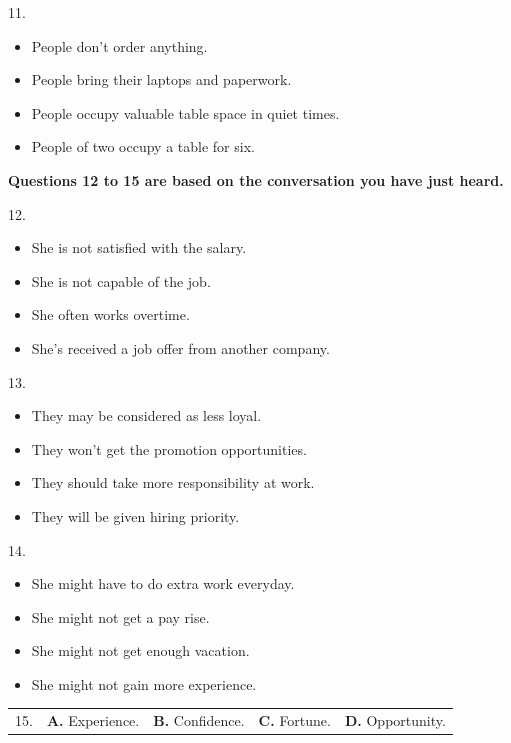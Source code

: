 \documentclass[UTF8,11pt]{ctexart}
\begin{document}
11.


\begin{itemize}[leftmargin=2em,itemsep=.2em,topsep=.4em]\item[A.] People don't order anything.
\item[B.] People bring their laptops and paperwork.
\item[C.] People occupy valuable table space in quiet times.
\item[D.] People of two occupy a table for six.
\end{itemize}

\textbf{Questions 12 to 15 are based on the conversation you have just heard.}


12.


\begin{itemize}[leftmargin=2em,itemsep=.2em,topsep=.4em]\item[A.] She is not satisfied with the salary.
\item[B.] She is not capable of the job.
\item[C.] She often works overtime.
\item[D.] She's received a job offer from another company.
\end{itemize}

13.


\begin{itemize}[leftmargin=2em,itemsep=.2em,topsep=.4em]\item[A.] They may be considered as less loyal.
\item[B.] They won't get the promotion opportunities.
\item[C.] They should take more responsibility at work.
\item[D.] They will be given hiring priority.
\end{itemize}

14.


\begin{itemize}[leftmargin=2em,itemsep=.2em,topsep=.4em]\item[A.] She might have to do extra work everyday.
\item[B.] She might not get a pay rise.
\item[C.] She might not get enough vacation.
\item[D.] She might not gain more experience.
\end{itemize}

\noindent\begin{tabularx}{\linewidth}{@{}lXXXX@{}}15. & \textbf{A.} Experience. & \textbf{B.} Confidence. & \textbf{C.} Fortune. & \textbf{D.} Opportunity.\\\end{tabularx}\par
\end{document}
